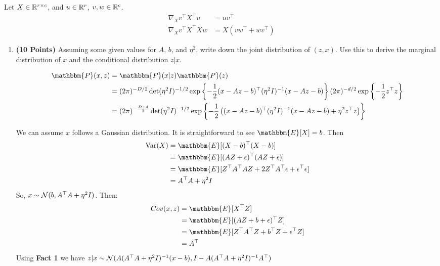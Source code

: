 \begin{fact}
Let $X\in \mathbb{R}^{r\times c}$, and $u\in \mathbb{R}^r$, $v,w \in \mathbb{R}^c$.
\begin{align*}
\nabla_X v^\top X^\top u &= uv^\top \\
\nabla_X v^\top X^\top X w &= X(vw^\top + wv^\top)
\end{align*}
\end{fact}
\vspace{0.1in}

\begin{enumerate}
\item \textbf{(10 Points)}
Assuming some given values for $A$, $b$, and $\eta^2$, write down the joint distribution of $(z,x)$. Use this to derive the marginal
distribution of $x$ and the conditional distribution $z|x$. 

\begin{soln}
  $$
  \begin{aligned}
    \mathbbm{P}(x, z) & = \mathbbm{P}(x \vert z) \mathbbm{P}(z) \\
    & = (2 \pi)^{-D/2} \det(\eta^2 I)^{-1/2} \exp\left\{-\frac{1}{2} (x - Az -  b)^\top (\eta^2 I)^{-1} (x - Az -b) \right\} (2 \pi)^{-d/2} \exp\left\{ -\frac{1}{2} z^\top z\right\} \\
    & = (2 \pi)^{-\frac{D + d}{2}} \det(\eta^2 I)^{-1/2} \exp\left\{-\frac{1}{2} \left((x - Az -  b)^\top (\eta^2 I)^{-1} (x - Az -b) + \eta^2 z^\top z\right) \right\}
  \end{aligned}
  $$

  We can assume $x$ follows a Gaussian distribution. 
  It is straightforward to see $\mathbbm{E}[X] = b$.
  Then 
  $$
  \begin{aligned}
    \text{Var}(X) & = \mathbbm{E}[(X-b)^\top (X-b)] \\
    & = \mathbbm{E}[(AZ + \epsilon)^\top (AZ + \epsilon)] \\
    & = \mathbbm{E}[Z^\top A^\top AZ + 2 Z^\top A^\top \epsilon + \epsilon^\top \epsilon] \\
    & = A^\top A + \eta^2 I
  \end{aligned}
  $$
  So, $x \sim \mathcal{N}(b, A^\top A + \eta^2 I)$.
  Then:
  $$
  \begin{aligned}
    Cov(x, z) & = \mathbbm{E}[X^\top Z] \\
    & = \mathbbm{E}[(AZ + b + \epsilon)^\top Z] \\
    & = \mathbbm{E}[Z^\top A^\top Z + b^\top Z + \epsilon^\top Z] \\
    & = A^\top
  \end{aligned}
  $$
  Using \textbf{Fact 1} we have $z \vert x \sim \mathcal{N}(A(A^\top A + \eta^2 I)^{-1}(x-b), I - A(A^\top A + \eta^2 I)^{-1}A^\top)$
\end{soln}


\end{enumerate}
